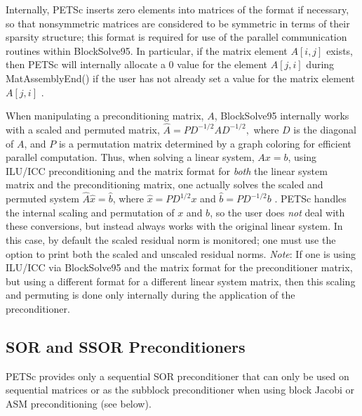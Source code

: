Internally, PETSc inserts zero elements into matrices of the  format if necessary, so that nonsymmetric matrices are
considered to be symmetric in terms of their sparsity structure; this
format is required for use of the parallel communication routines
within BlockSolve95. In particular, if the matrix element $A[i,j]$
exists, then PETSc will internally allocate a 0 value for the element
$ A[j,i] $ during MatAssemblyEnd() if the user has not already set
a value for the matrix element $ A[j,i] $ .

When manipulating a preconditioning matrix, $ A $, BlockSolve95
internally works with a scaled and permuted matrix, $ \hat{A} = P
D^{-1/2} A D^{-1/2},$ where $ D $ is the diagonal of $ A $, and $ P $ is a
permutation matrix determined by a graph coloring for efficient
parallel computation.  Thus, when solving a linear system, $ Ax=b $,
using ILU/ICC preconditioning and the matrix format 
for {\em both} the linear system matrix and the preconditioning
matrix, one actually solves the scaled and permuted system $ \hat{A}
\hat{x} = \hat{b} $, where $ \hat{x} = P D^{1/2} x $ and $\hat{b} = P
D^{-1/2} b$ .  PETSc handles the internal scaling and permutation of
$ x $ and $ b $, so the user does {\em not} deal with these conversions, 
but instead always works with the original linear system.  In
this case, by default the scaled residual norm is monitored; one must use the
option   to print both the
scaled and unscaled residual norms. {\em Note}: If one is using ILU/ICC via
BlockSolve95 and the  matrix format for the 
preconditioner matrix, but using a different format for a different
linear system matrix, then this scaling and permuting is done only
internally during the application of the preconditioner.



\subsection{SOR and SSOR Preconditioners}

PETSc provides only a sequential SOR preconditioner that can only be used on sequential 
matrices or as the subblock preconditioner when using block Jacobi or 
ASM preconditioning (see below).


